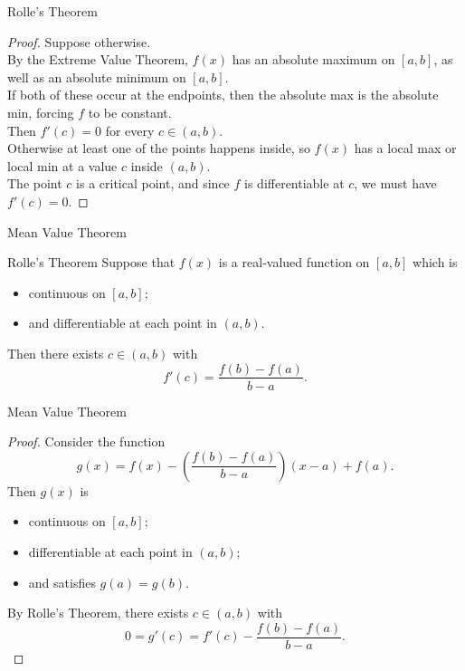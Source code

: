 \documentclass{beamer}
\begin{document}
\begin{frame}{Rolle's Theorem}
\begin{proof}
Suppose otherwise.\\
\pause
By the Extreme Value Theorem, $f(x)$ has an absolute maximum on $[a,b]$, as well as an absolute minimum on $[a,b]$.\\
\pause
If both of these occur at the endpoints, then the absolute max is the absolute min, forcing $f$ to be constant.\\
\pause
Then $f'(c)=0$ for every $c\in (a,b)$.\\
\pause
Otherwise at least one of the points happens inside, so $f(x)$ has a local max or local min at a value $c$ inside $(a,b)$.\\
\pause
The point $c$ is a critical point, and since $f$ is differentiable at $c$, we must have $f'(c)=0$.
\end{proof}
\end{frame}

\begin{frame}{Mean Value Theorem}
\begin{thm}{Rolle's Theorem}
Suppose that $f(x)$ is a real-valued function on $[a,b]$ which is
\begin{itemize}
\pause
\item continuous on $[a,b]$;
\pause
\item and differentiable at each point in $(a,b)$.
\end{itemize}
\pause
Then there exists $c\in (a,b)$ with
$$f'(c) = \frac{f(b)-f(a)}{b-a}.$$
\end{thm}
\end{frame}

\begin{frame}{Mean Value Theorem}
\begin{proof}
Consider the function
$$g(x) = f(x)-\left(\frac{f(b)-f(a)}{b-a}\right)(x-a) + f(a).$$
\pause
Then $g(x)$ is
\begin{itemize}
\pause
\item continuous on $[a,b]$;
\pause
\item differentiable at each point in $(a,b)$;
\pause
\item and satisfies $g(a) = g(b)$.
\end{itemize}
\pause
By Rolle's Theorem, there exists $c\in (a,b)$ with
$$0 = g'(c) = f'(c) -\frac{f(b)-f(a)}{b-a}.$$
\end{proof}
\end{frame}
\end{document}
